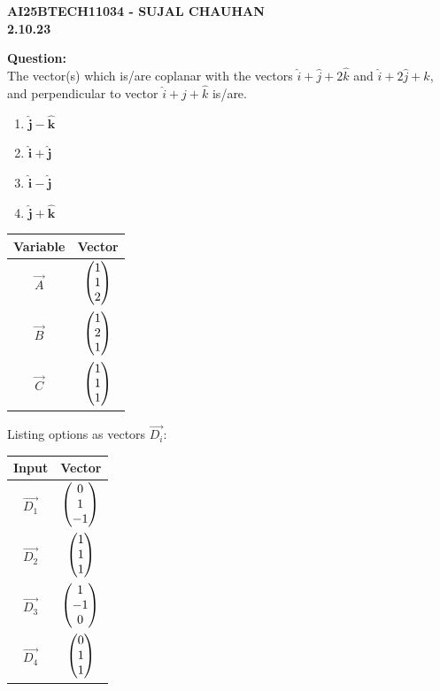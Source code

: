 \documentclass[12pt]{article}
\begin{document}
\newpage
\begin{center}
\textbf{\Large AI25BTECH11034 - SUJAL CHAUHAN }\\
\textbf{2.10.23}
\end{center}

\textbf{Question:}\\
The vector(s) which is/are coplanar with the vectors $\hat{i}+\hat{j}+2\hat{k}$ and $\hat{i}+2\hat{j}+\hat{k}$, and perpendicular to vector $\hat{i}+\hat{j}+\hat{k}$ is/are.
\begin{enumerate}
    \item $\hat{\mathbf{j}} - \hat{\mathbf{k}}$
    \item $\hat{\mathbf{i}} + \hat{\mathbf{j}}$
    \item $\hat{\mathbf{i}} - \hat{\mathbf{j}}$
    \item $\hat{\mathbf{j}} + \hat{\mathbf{k}}$
\end{enumerate}

\begin{center}
\begin{tabular}{|c|c|}
\hline
Variable & Vector \\ \hline
$\vec{A}$ & $\begin{pmatrix}1 \\ 1 \\ 2\end{pmatrix}$ \\ \hline
$\vec{B}$ & $\begin{pmatrix}1 \\ 2 \\ 1\end{pmatrix}$ \\ \hline
$\vec{C}$ & $\begin{pmatrix}1 \\ 1 \\ 1\end{pmatrix}$ \\ \hline
\end{tabular}
\end{center}

Listing options as vectors $\vec{D_i}$:

\begin{center}
\begin{tabular}{|c|c|}
\hline
Input & Vector \\ \hline
$\vec{D_1}$ & $\begin{pmatrix}0 \\ 1 \\ -1\end{pmatrix}$ \\ \hline
$\vec{D_2}$ & $\begin{pmatrix}1 \\ 1 \\ 1\end{pmatrix}$ \\ \hline
$\vec{D_3}$ & $\begin{pmatrix}1 \\ -1 \\ 0\end{pmatrix}$ \\ \hline
$\vec{D_4}$ & $\begin{pmatrix}0 \\ 1 \\ 1\end{pmatrix}$ \\ \hline
\end{tabular}
\end{center}
\end{document}
